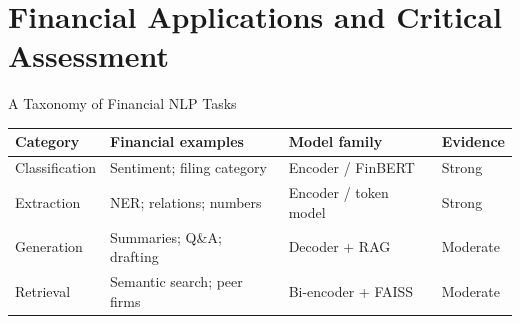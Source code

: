 \documentclass[11pt,aspectratio=169,professionalfonts]{beamer}
\begin{document}
\section{Financial Applications and Critical Assessment}
%
\begin{frame}{A Taxonomy of Financial NLP Tasks}

  \begin{center}
  \renewcommand{\arraystretch}{1.3}
  \setlength{\tabcolsep}{3pt}

  \begin{tabular}{@{}llll@{}}
    \toprule
    \textbf{Category}
      & \textbf{Financial examples}
      & \textbf{Model family}
      & \textbf{Evidence} \\
    \midrule

    Classification
      & Sentiment; filing category
      & Encoder / FinBERT
      & Strong \\

    Extraction
      & NER; relations; numbers
      & Encoder / token model
      & Strong \\

    Generation
      & Summaries; Q\&A; drafting
      & Decoder + RAG
      & Moderate \\

    Retrieval
      & Semantic search; peer firms
      & Bi-encoder + FAISS
      & Moderate \\

    \bottomrule
  \end{tabular}

  \end{center}

\end{frame}
%
%
\end{document}
